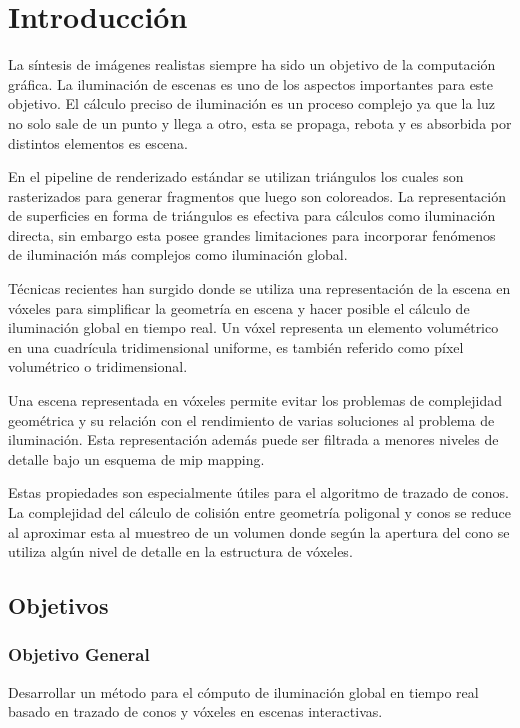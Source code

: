 \chapter*{Introducción}
\label{ch:intro}
La síntesis de imágenes realistas siempre ha sido un objetivo de la computación gráfica. La iluminación de escenas es uno de los aspectos importantes para este objetivo. El cálculo preciso de iluminación es un proceso complejo ya que la luz no solo sale de un punto y llega a otro, esta se propaga, rebota y es absorbida por distintos elementos es escena.

En el pipeline de renderizado estándar se utilizan triángulos los cuales son rasterizados para generar fragmentos que luego son coloreados. La representación de superficies en forma de triángulos es efectiva para cálculos como iluminación directa, sin embargo esta posee grandes limitaciones para incorporar fenómenos de iluminación más complejos como iluminación global.

Técnicas recientes han surgido donde se utiliza una representación de la escena en vóxeles para simplificar la geometría en escena y hacer posible el cálculo de iluminación global en tiempo real. Un vóxel representa un elemento volumétrico en una cuadrícula tridimensional uniforme, es también referido como píxel volumétrico o tridimensional.

Una escena representada en vóxeles permite evitar los problemas de complejidad geométrica y su relación con el rendimiento de varias soluciones al problema de iluminación. Esta representación además puede ser filtrada a menores niveles de detalle bajo un esquema de mip mapping. 

Estas propiedades son especialmente útiles para el algoritmo de trazado de conos. La complejidad del cálculo de colisión entre geometría poligonal y conos se reduce al aproximar esta al muestreo de un volumen donde según la apertura del cono se utiliza algún nivel de detalle en la estructura de vóxeles.

\section*{Objetivos} %
\label{sec:section_name}
\subsection*{Objetivo General} %
\label{sub:subsection_name}
Desarrollar un método para el cómputo de iluminación global en tiempo real basado en trazado de conos y vóxeles en escenas interactivas.
